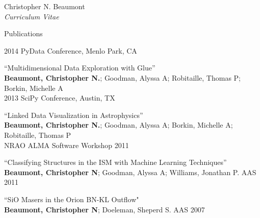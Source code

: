 \documentclass[10pt]{article}
\newenvironment{sublist}{%
	\begin{list}{}{%
		\setlength{\itemsep}{0em}\setlength{\parsep}{0em}%
		\setlength{\topsep}{0em}\setlength{\parskip}{0em}%
	}%
}%
{ \end{list} }
\begin{document}
\begin{cv}{Christopher N. Beaumont\\{\large \itshape Curriculum Vitae}}
\begin{cvlist}{Publications}
\begin{sublist}
	2014 PyData Conference, Menlo Park, CA\\
	\item ``Multidimensional Data Exploration with Glue''\\
	\textbf{Beaumont, Christopher N.}; Goodman, Alyssa A; Robitaille, Thomas P;  Borkin, Michelle A \\
	2013 SciPy Conference, Austin, TX \\
	\item ``Linked Data Visualization in Astrophysics''\\
	\textbf{Beaumont, Christopher N.}; Goodman, Alyssa A; Borkin, Michelle A; Robitaille, Thomas P \\
	NRAO ALMA Software Workshop 2011 \\
	\item ``Classifying Structures in the ISM with Machine Learning Techniques'' \\
	\textbf{Beaumont, Christopher N}; Goodman, Alyssa A; Williams, Jonathan P. AAS 2011 \\
	\item ``SiO Masers in the Orion BN-KL Outflow"\\
	\textbf{Beaumont, Christopher N}; Doeleman, Sheperd S. AAS 2007
	\end{sublist} 
\end{cvlist}
\setlength{\cvlabelwidth}{\oldcvlabelwidth}

\setlength{\oldcvlabelwidth}{\cvlabelwidth}
\setlength{\cvlabelwidth}{1em}
\setlength{\cvlabelwidth}{\oldcvlabelwidth}

\setlength{\oldcvlabelwidth}{\cvlabelwidth}
\setlength{\cvlabelwidth}{1em}
\begin{comment}
\begin{cvlist}{Technical Skills}
	\item \textbf{Proficient}
	\begin{sublist}
		\item Python, IDL 
	\end{sublist}
	\item \textbf{Familiar} 
	\begin{sublist}
		\item Mathematica, C, Java, Python, PHP, Perl
	\end{sublist}
\end{cvlist}
\setlength{\cvlabelwidth}{\oldcvlabelwidth}
\end{comment}

\end{cv}
\end{document}
